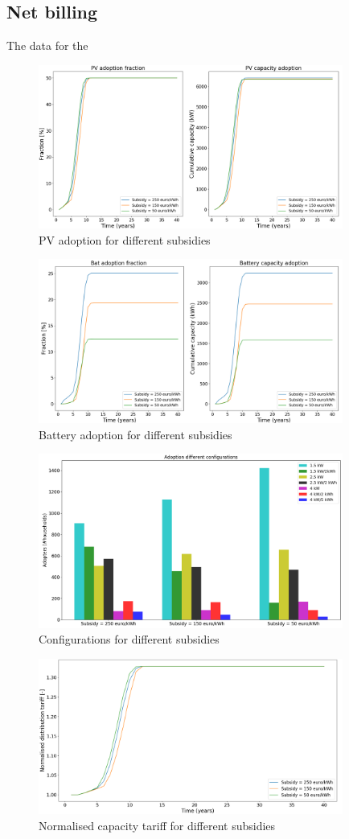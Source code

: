 \subsection{Net billing}
The data for the 
\newline 
\begin{figure}[h!]
    \centering
    \includegraphics[width=10cm]{AppendixA/PVNBsubs.png}
    \caption{PV adoption for different subsidies}
    \label{fig:}
\end{figure}
\noindent
\newline 
\begin{figure}[h!]
    \centering
    \includegraphics[width=10cm]{AppendixA/BatNBsubs.png}
    \caption{Battery adoption for different subsidies}
    \label{fig:}
\end{figure}
\noindent
\newline 
\begin{figure}[h!]
    \centering
    \includegraphics[width=10cm]{AppendixA/ConfigNBsubs.PNG}
    \caption{Configurations for different subsidies}
    \label{fig:}
\end{figure}
\noindent
\newline
\begin{figure}[h!]
    \centering
    \includegraphics[width=10cm]{AppendixA/DistNBsubs.PNG}
    \caption{Normalised capacity tariff for different subsidies}
    \label{fig:}
\end{figure}